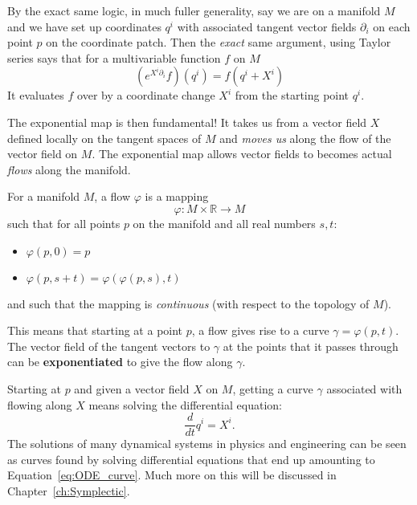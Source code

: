 		By the exact same logic, in much fuller generality, say we are on a manifold $M$ and we have set up coordinates $q^i$ with associated tangent vector fields $\partial_i$ on each point $p$ on the coordinate patch. Then the \emph{exact} same argument, using Taylor series says that for a multivariable function $f$ on $M$
		\begin{equation}
			(e^{X^i \partial_i} f)(q^i) = f(q^i + X^i)
		\end{equation}
		It evaluates $f$ over by a coordinate change $X^i$ from the starting point $q^i$.
		
		The exponential map is then fundamental! It takes us from a vector field $X$ defined locally on the tangent spaces of $M$ and \emph{moves us} along the flow of the vector field on $M$. The exponential map allows vector fields to becomes actual \emph{flows} along the manifold. 
		\begin{defn}
			For a manifold $M$, a flow $\varphi$ is a mapping
			\begin{equation}
				\varphi: M \times \mathbb R \rightarrow M
			\end{equation}
			such that for all points $p$ on the manifold and all real numbers $s,t$:
			\begin{itemize}
				\item $\varphi(p,0) = p$
				\item $\varphi(p,s+t) = \varphi(\varphi(p,s),t)$
			\end{itemize}
			and such that the mapping is \emph{continuous} (with respect to the topology of $M$).
		\end{defn}
		This means that starting at a point $p$, a flow gives rise to a curve $\gamma = \varphi(p,t)$. The vector field of the tangent vectors to $\gamma$ at the points that it passes through can be \textbf{exponentiated} to give the flow along $\gamma$.
		
		Starting at $p$ and given a vector field $X$ on $M$, getting a curve $\gamma$ associated with flowing along $X$ means solving the differential equation:
		\begin{equation}\label{eq:ODE_curve}
			\frac{d}{dt} q^i = X^i.
		\end{equation}
		The solutions of many dynamical systems in physics and engineering can be seen as curves found by solving differential equations that end up amounting to  Equation~\eqref{eq:ODE_curve}. Much more on this will be discussed in Chapter~\ref{ch:Symplectic}. 
		
